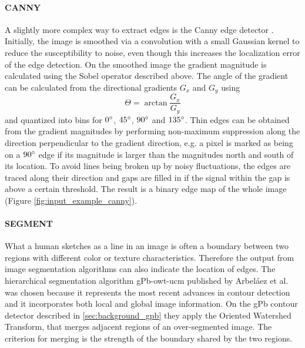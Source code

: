 \paragraph{CANNY}

A slightly more complex way to extract edges is the Canny edge detector
\autocite{canny_computational_1986}. Initially, the image is smoothed via a
convolution with a small Gaussian kernel to reduce the susceptibility to noise,
even though this increases the localization error of the edge detection. On the
smoothed image the gradient magnitude is calculated using the Sobel operator
described above. The angle of the gradient can be calculated from the
directional gradients $G_x$ and $G_y$ using
\begin{equation*}
    \Theta = \arctan{\frac{G_x}{G_y}}
\end{equation*}
and quantized into bins for $0 \degree$, $45 \degree$, $90 \degree$ and $135
\degree$. Thin edges can be obtained from the gradient magnitudes by performing
non-maximum suppression along the direction perpendicular to the gradient
direction, e.g. a pixel is marked as being on a $90 \degree$ edge if its
magnitude is larger than the magnitudes north and south of its location. To
avoid lines being broken up by noisy fluctuations, the edges are traced along
their direction and gaps are filled in if the signal within the gap is above a
certain threshold. The result is a binary edge map of the whole image (Figure
\ref{fig:input_example_canny}).

\paragraph{SEGMENT}

What a human sketches as a line in an image is often a boundary between two
regions with different color or texture characteristics. Therefore the output
from image segmentation algorithms can also indicate the location of edges. The
hierarchical segmentation algorithm gPb-owt-ucm published by Arbeláez et al.\ 
\autocite{arbelaez_contours_2009} \autocite{arbelaez_contour_2011} was chosen
because it represents the most recent advances in contour detection and it
incorporates both local and global image information. On the gPb contour
detector described in \ref{sec:background_gpb} they apply the Oriented
Watershed Transform, that merges adjacent regions of an over-segmented image.
The criterion for merging is the strength of the boundary shared by the two
regions.

